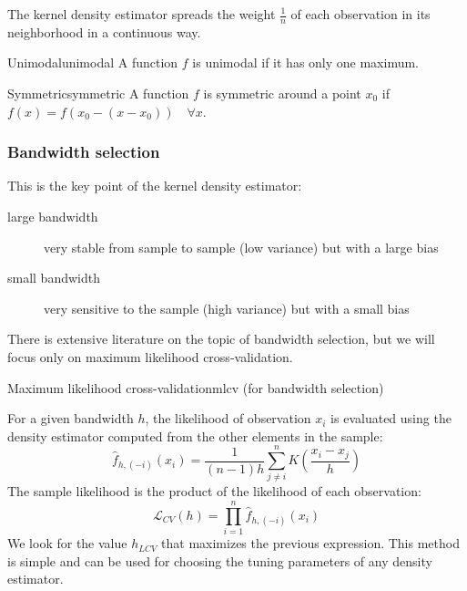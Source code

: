 The kernel density estimator spreads the weight $\frac{1}{n}$ of each
observation in its neighborhood in a continuous way.

\begin{definition}{Unimodal}{unimodal}
	A function $f$ is unimodal if it has only one maximum.
\end{definition}

\begin{definition}{Symmetric}{symmetric}
	A function $f$ is symmetric around a point $x_0$ if $f(x) = f(x_0 - (x - x_0)) \quad \forall x$.
\end{definition}

\subsubsection{Bandwidth selection}
\begin{marker}{}
	This is the key point of the kernel density estimator:

	\begin{description}
		\item[large bandwidth] very stable from sample to sample (low variance) but with a large bias
		\item[small bandwidth] very sensitive to the sample (high variance) but with a small bias
	\end{description}
\end{marker}

There is extensive literature on the topic of bandwidth selection, but we will
focus only on maximum likelihood cross-validation.

\begin{definition}{Maximum likelihood cross-validation}{mlcv}
	(for bandwidth selection)

	For a given bandwidth $h$, the likelihood of observation $x_i$ is evaluated
	using the density estimator computed from the other elements in the sample:
	\begin{equation*}
		\hat{f}_{h,(-i)}(x_i) = \frac{1}{(n-1)h}\sum_{j \neq i}^n K\left( \frac{x_i - x_j}{h} \right)
	\end{equation*}
	The sample likelihood is the product of the likelihood of each observation:
	\begin{equation*}
		\mathcal{L}_{CV}(h) = \prod_{i=1}^n \hat{f}_{h,(-i)}(x_i)
	\end{equation*}
	We look for the value $h_{LCV}$ that maximizes the previous expression.
	\tcblower
	This method is simple and can be used for choosing the tuning parameters of any density estimator.
\end{definition}



